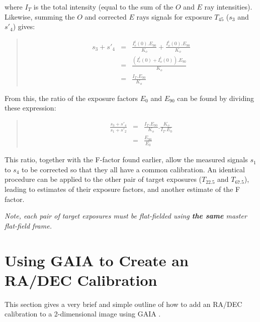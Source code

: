 \documentclass[twoside,11pt]{article}
\newcommand{\xref}[3]{#1}
\newcommand{\xlabel}[1]{}
\renewcommand{\_}{\texttt{\symbol{95}}}
\newenvironment{myquote}{\begin{quote}\begin{small}}{\end{small}\end{quote}}
\begin{document}
where $I_{T}$ is the total intensity (equal to the sum of the $O$ and $E$
ray intensities). Likewise, summing the $O$ and corrected $E$ rays signals 
for exposure $T_{45}$ ($s_{3}$ and $s'_{4}$) gives:

\begin{myquote}
\begin{eqnarray*}
   s_{3} + s'_{4} & = & \frac{ I^{t}_{e}(0).E_{90} }{ K_{o} } +
                        \frac{ I^{t}_{o}(0).E_{90} }{ K_{o} } \\
                  & = & \frac{ ( I^{t}_{e}(0) + I^{t}_{o}(0) ).E_{90} }{ K_{o} } \\ 
                  & = & \frac{ I_{T}.E_{90} }{ K_{o} } 
\end{eqnarray*}
\end{myquote}

From this, the ratio of the exposure factors $E_{0}$ and $E_{90}$ can be
found by dividing these expression:

\begin{myquote}
\begin{eqnarray*}
   \frac{ s_{3} + s'_{4} }{ s_{1} + s'_{2} }  & = & \frac{ I_{T}.E_{90} }{ K_{o} }.\frac{ K_{o} }{ I_{T}.E_{0} } \\
                                              & = & \frac{ E_{90} }{ E_{0} } 
\end{eqnarray*}
\end{myquote}

This ratio, together with the F-factor found earlier, allow the measured
signals $s_{1}$ to $s_{4}$ to be corrected so that they all have a common
calibration. An identical procedure can be applied to the other pair of
target exposures ($T_{22.5}$ and $T_{67.5}$), leading to estimates of
their exposure factors, and another estimate of the F factor.

\emph{Note, each pair of target exposures must be flat-fielded using
\textbf{the same} master flat-field frame.}

\section{\label{APP:GAIA}\xlabel{gaia}Using GAIA to Create an RA/DEC Calibration}
This section gives a very brief and simple outline of how to add an RA/DEC
calibration to a 2-dimensional image using \xref{GAIA}{sun214}{} . 
\end{document}
